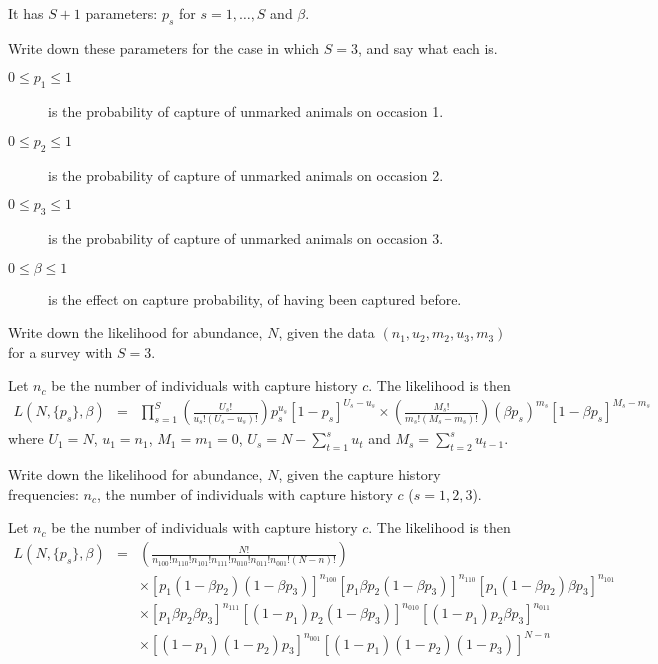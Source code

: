 \begin{questions}
\begin{parts}
{\begin{solution}
It has $S+1$ parameters: $p_s$ for $s=1,\ldots,S$ and $\beta$.
\end{solution}}

\item Write down these parameters for the case in which $S=3$, and say what each is.

{\begin{solution}
\begin{description}
\item [$0\leq p_1\leq 1$] is the probability of capture of unmarked animals on occasion 1.
\item [$0\leq p_2\leq 1$] is the probability of capture of unmarked animals on occasion 2.
\item [$0\leq p_3\leq 1$] is the probability of capture of unmarked animals on occasion 3.
\item [$0\leq\beta\leq 1$] is the effect on capture probability, of having been captured before.
\end{description}
\end{solution}}

\item Write down the likelihood for abundance, $N$, given the data $(n_1, u_2, m_2, u_3, m_3)$ for a survey with $S=3$.

{\begin{solution}
Let $n_c$ be the number of individuals with capture history $c$. The likelihood is then
\begin{eqnarray*}
L(N,\{p_s\},\beta)&=&\prod_{s=1}^S\left(\frac{U_s!}{u_s!(U_s-u_s)!}\right)p_s^{u_s}[1-p_s]^{U_s-u_s}\times 
\left(\frac{M_s!}{m_s!(M_s-m_s)!}\right)(\beta p_s)^{m_s}[1-\beta p_s]^{M_s-m_s}
\end{eqnarray*}
\noindent
where $U_1=N$, $u_1=n_1$, $M_1=m_1=0$, $U_s=N-\sum_{t=1}^su_t$ and $M_s=\sum_{t=2}^su_{t-1}$.

\end{solution}}

\item Write down the likelihood for abundance, $N$, given the capture history frequencies: $n_c$, the number of individuals with capture history $c$ ($s=1,2,3$).

{\begin{solution}
Let $n_c$ be the number of individuals with capture history $c$. The likelihood is then
\begin{eqnarray*}
L(N,\{p_s\},\beta)&=&\left(\frac{N!}{n_{100}!n_{110}!n_{101}!n_{111}!n_{010}!n_{011}!n_{001}!(N-n)!}\right) \\
& &\times\left[p_1(1-\beta p_2)(1-\beta p_3)\right]^{n_{100}}\left[p_1\beta p_2(1-\beta p_3)\right]^{n_{110}}\left[p_1(1-\beta p_2)\beta p_3\right]^{n_{101}} \\
& & \times\left[p_1\beta p_2\beta p_3\right]^{n_{111}}\left[(1-p_1)p_2(1-\beta p_3)\right]^{n_{010}}\left[(1-p_1)p_2\beta p_3\right]^{n_{011}} \\
& & \times\left[(1-p_1)(1-p_2)p_3\right]^{n_{001}}
\left[(1-p_1)(1-p_2)(1-p_3)\right]^{N-n}
\end{eqnarray*}


\end{solution}}
\end{parts}
\end{questions}
